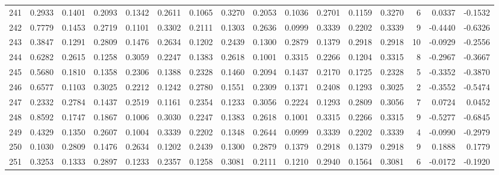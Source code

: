 \begin{tabular}{lrrrrrrrrrrrrrrr}
241 &      0.2933 &  0.1401 &  0.2093 &  0.1342 &  0.2611 &  0.1065 &  0.3270 &  0.2053 &  0.1036 &  0.2701 &   0.1159 &     0.3270 &      6 &                    0.0337 &                    -0.1532 \\
242 &      0.7779 &  0.1453 &  0.2719 &  0.1101 &  0.3302 &  0.2111 &  0.1303 &  0.2636 &  0.0999 &  0.3339 &   0.2202 &     0.3339 &      9 &                   -0.4440 &                    -0.6326 \\
243 &      0.3847 &  0.1291 &  0.2809 &  0.1476 &  0.2634 &  0.1202 &  0.2439 &  0.1300 &  0.2879 &  0.1379 &   0.2918 &     0.2918 &     10 &                   -0.0929 &                    -0.2556 \\
244 &      0.6282 &  0.2615 &  0.1258 &  0.3059 &  0.2247 &  0.1383 &  0.2618 &  0.1001 &  0.3315 &  0.2266 &   0.1204 &     0.3315 &      8 &                   -0.2967 &                    -0.3667 \\
245 &      0.5680 &  0.1810 &  0.1358 &  0.2306 &  0.1388 &  0.2328 &  0.1460 &  0.2094 &  0.1437 &  0.2170 &   0.1725 &     0.2328 &      5 &                   -0.3352 &                    -0.3870 \\
246 &      0.6577 &  0.1103 &  0.3025 &  0.2212 &  0.1242 &  0.2780 &  0.1551 &  0.2309 &  0.1371 &  0.2408 &   0.1293 &     0.3025 &      2 &                   -0.3552 &                    -0.5474 \\
247 &      0.2332 &  0.2784 &  0.1437 &  0.2519 &  0.1161 &  0.2354 &  0.1233 &  0.3056 &  0.2224 &  0.1293 &   0.2809 &     0.3056 &      7 &                    0.0724 &                     0.0452 \\
248 &      0.8592 &  0.1747 &  0.1867 &  0.1006 &  0.3030 &  0.2247 &  0.1383 &  0.2618 &  0.1001 &  0.3315 &   0.2266 &     0.3315 &      9 &                   -0.5277 &                    -0.6845 \\
249 &      0.4329 &  0.1350 &  0.2607 &  0.1004 &  0.3339 &  0.2202 &  0.1348 &  0.2644 &  0.0999 &  0.3339 &   0.2202 &     0.3339 &      4 &                   -0.0990 &                    -0.2979 \\
250 &      0.1030 &  0.2809 &  0.1476 &  0.2634 &  0.1202 &  0.2439 &  0.1300 &  0.2879 &  0.1379 &  0.2918 &   0.1379 &     0.2918 &      9 &                    0.1888 &                     0.1779 \\
251 &      0.3253 &  0.1333 &  0.2897 &  0.1233 &  0.2357 &  0.1258 &  0.3081 &  0.2111 &  0.1210 &  0.2940 &   0.1564 &     0.3081 &      6 &                   -0.0172 &                    -0.1920 \\

\end{tabular}
